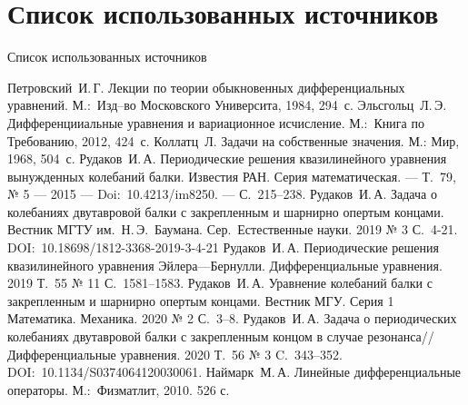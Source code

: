 \documentclass[10pt, ignoreonframetext,unicode]{beamer}
\begin{document}
\section{Список использованных источников}
\begin{frame}{Список использованных источников}
	\begin{thebibliography}{9}
		\scriptsize
		 Петровский~И.\,Г. Лекции по теории обыкновенных дифференциальных уравнений.	М.:~Изд–во Московского Университа, 1984, 294~с.
		 Эльсгольц~Л.\,Э. Дифференцииальные уравнения и вариационное исчисление. М.:~Книга по Требованию, 2012, 424~с.
		 Коллатц~Л. Задачи на собственные значения. М.: Мир, 1968, 504~с.
		 Рудаков~И.\,А. Периодические решения квазилинейного уравнения вынужденных колебаний балки. Известия РАН. Серия математическая. --- Т.~79, № 5 --- 2015 --- Doi:~10.4213/im8250. --- 
		С.~215--238.
		 Рудаков~И.\,А. Задача о колебаниях двутавровой балки с закрепленным и шарнирно опертым концами. Вестник МГТУ им.~Н.\,Э.~Баумана. Сер.~Естест\-вен\-ные науки. 2019 № 3 С.~4-21. DOI:~10.18698/1812-3368-2019-3-4-21
		 Рудаков~И.\,А. Периодические решения квазилинейного уравнения Эйлера---Бернулли. Дифференциальные уравнения. 2019 Т.~55 № 11 С.~1581--1583.
		 Рудаков~И.\,А. Уравнение колебаний балки с закрепленным и шарнирно	опертым концами. Вестник МГУ. Серия 1 Математика. Механика. 2020 № 2	С.~3--8.
		 Рудаков~И.\,А. Задача о периодических колебаниях двутавровой балки с	закрепленным концом в случае резонанса// Дифференциальные уравнения.	2020 Т.~56 № 3 C.~343--352. DOI:~10.1134/S0374064120030061.
		 Наймарк~М.\,А. Линейные дифференциальные операторы. М.:~Физматлит, 2010. 526 с.
	\end{thebibliography}
\end{frame}
\end{document}
